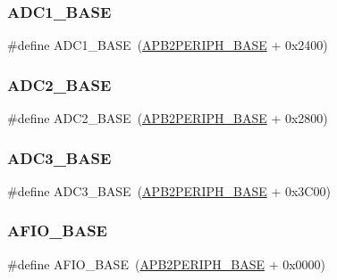 \subsubsection{\texorpdfstring{ADC1\_BASE}{ADC1\_BASE}}
{\footnotesize\ttfamily \#define A\+D\+C1\+\_\+\+B\+A\+SE~(\mbox{\hyperlink{group___peripheral__memory__map_ga25b99d6065f1c8f751e78f43ade652cb}{A\+P\+B2\+P\+E\+R\+I\+P\+H\+\_\+\+B\+A\+SE}} + 0x2400)}

\mbox{\label{group___peripheral__memory__map_ga6544abc57f9759f610eee09a02442ae6}} 
\subsubsection{\texorpdfstring{ADC2\_BASE}{ADC2\_BASE}}
{\footnotesize\ttfamily \#define A\+D\+C2\+\_\+\+B\+A\+SE~(\mbox{\hyperlink{group___peripheral__memory__map_ga25b99d6065f1c8f751e78f43ade652cb}{A\+P\+B2\+P\+E\+R\+I\+P\+H\+\_\+\+B\+A\+SE}} + 0x2800)}

\mbox{\label{group___peripheral__memory__map_gaca766f86c8e0b00a8e2b0224dcbb4c82}} 
\subsubsection{\texorpdfstring{ADC3\_BASE}{ADC3\_BASE}}
{\footnotesize\ttfamily \#define A\+D\+C3\+\_\+\+B\+A\+SE~(\mbox{\hyperlink{group___peripheral__memory__map_ga25b99d6065f1c8f751e78f43ade652cb}{A\+P\+B2\+P\+E\+R\+I\+P\+H\+\_\+\+B\+A\+SE}} + 0x3\+C00)}

\mbox{\label{group___peripheral__memory__map_ga5f7e3eacfcf4c313c25012795148a680}} 
\subsubsection{\texorpdfstring{AFIO\_BASE}{AFIO\_BASE}}
{\footnotesize\ttfamily \#define A\+F\+I\+O\+\_\+\+B\+A\+SE~(\mbox{\hyperlink{group___peripheral__memory__map_ga25b99d6065f1c8f751e78f43ade652cb}{A\+P\+B2\+P\+E\+R\+I\+P\+H\+\_\+\+B\+A\+SE}} + 0x0000)}

